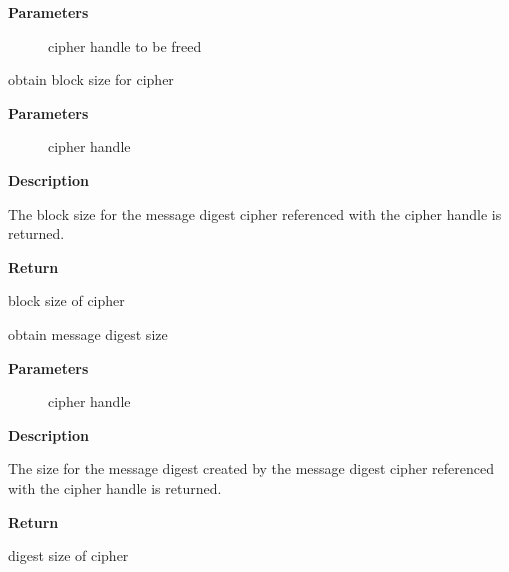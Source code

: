\documentclass[a4paper,8pt,english]{sphinxmanual}
\begin{document}
\textbf{Parameters}
\begin{description}
\item[{}] \leavevmode
cipher handle to be freed

\end{description}

\begin{fulllineitems}
\label{crypto/api-digest:c.crypto_shash_blocksize}
obtain block size for cipher

\end{fulllineitems}


\textbf{Parameters}
\begin{description}
\item[{}] \leavevmode
cipher handle

\end{description}

\textbf{Description}

The block size for the message digest cipher referenced with the cipher
handle is returned.

\textbf{Return}

block size of cipher

\begin{fulllineitems}
\label{crypto/api-digest:c.crypto_shash_digestsize}
obtain message digest size

\end{fulllineitems}


\textbf{Parameters}
\begin{description}
\item[{}] \leavevmode
cipher handle

\end{description}

\textbf{Description}

The size for the message digest created by the message digest cipher
referenced with the cipher handle is returned.

\textbf{Return}

digest size of cipher
\end{document}
